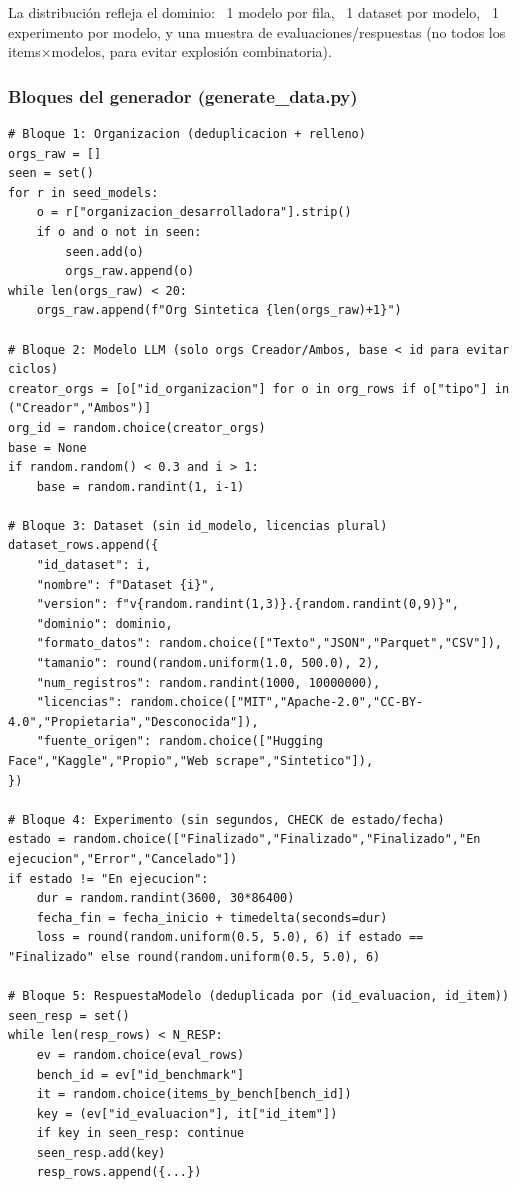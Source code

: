 \documentclass[12pt,a4paper]{article}
\begin{document}
La distribución refleja el dominio: ~1 modelo por fila, ~1 dataset por modelo, ~1 experimento por modelo, y una muestra de evaluaciones/respuestas (no todos los items×modelos, para evitar explosión combinatoria).

\subsubsection{Bloques del generador (generate\_data.py)}

\begin{lstlisting}
# Bloque 1: Organizacion (deduplicacion + relleno)
orgs_raw = []
seen = set()
for r in seed_models:
    o = r["organizacion_desarrolladora"].strip()
    if o and o not in seen:
        seen.add(o)
        orgs_raw.append(o)
while len(orgs_raw) < 20:
    orgs_raw.append(f"Org Sintetica {len(orgs_raw)+1}")

# Bloque 2: Modelo LLM (solo orgs Creador/Ambos, base < id para evitar ciclos)
creator_orgs = [o["id_organizacion"] for o in org_rows if o["tipo"] in ("Creador","Ambos")]
org_id = random.choice(creator_orgs)
base = None
if random.random() < 0.3 and i > 1:
    base = random.randint(1, i-1)

# Bloque 3: Dataset (sin id_modelo, licencias plural)
dataset_rows.append({
    "id_dataset": i,
    "nombre": f"Dataset {i}",
    "version": f"v{random.randint(1,3)}.{random.randint(0,9)}",
    "dominio": dominio,
    "formato_datos": random.choice(["Texto","JSON","Parquet","CSV"]),
    "tamanio": round(random.uniform(1.0, 500.0), 2),
    "num_registros": random.randint(1000, 10000000),
    "licencias": random.choice(["MIT","Apache-2.0","CC-BY-4.0","Propietaria","Desconocida"]),
    "fuente_origen": random.choice(["Hugging Face","Kaggle","Propio","Web scrape","Sintetico"]),
})

# Bloque 4: Experimento (sin segundos, CHECK de estado/fecha)
estado = random.choice(["Finalizado","Finalizado","Finalizado","En ejecucion","Error","Cancelado"])
if estado != "En ejecucion":
    dur = random.randint(3600, 30*86400)
    fecha_fin = fecha_inicio + timedelta(seconds=dur)
    loss = round(random.uniform(0.5, 5.0), 6) if estado == "Finalizado" else round(random.uniform(0.5, 5.0), 6)

# Bloque 5: RespuestaModelo (deduplicada por (id_evaluacion, id_item))
seen_resp = set()
while len(resp_rows) < N_RESP:
    ev = random.choice(eval_rows)
    bench_id = ev["id_benchmark"]
    it = random.choice(items_by_bench[bench_id])
    key = (ev["id_evaluacion"], it["id_item"])
    if key in seen_resp: continue
    seen_resp.add(key)
    resp_rows.append({...})
\end{lstlisting}
\end{document}
